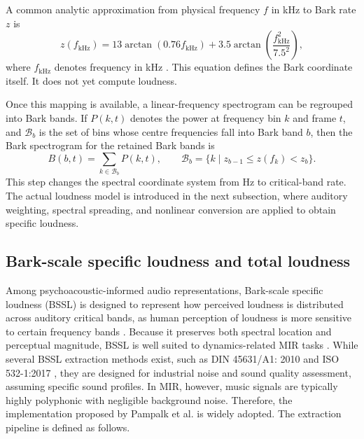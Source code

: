 A common analytic approximation from physical frequency $f$ in kHz to Bark rate $z$ is
\begin{equation}
z(f_{\mathrm{kHz}}) = 13\arctan(0.76 f_{\mathrm{kHz}}) + 3.5\arctan\!\left(\frac{f_{\mathrm{kHz}}^2}{7.5^2}\right),
\label{eq:bg:bark_mapping}
\end{equation}
where $f_{\mathrm{kHz}}$ denotes frequency in kHz \cite{pampalk2002content,pampalk2004exploring,zwicker1999psychoacoustics}. This equation defines the Bark coordinate itself. It does not yet compute loudness. 

Once this mapping is available, a linear-frequency spectrogram can be regrouped into Bark bands. If $P(k,t)$ denotes the power at frequency bin $k$ and frame $t$, and $\mathcal{B}_b$ is the set of bins whose centre frequencies fall into Bark band $b$, then the Bark spectrogram for the retained Bark bands is
\begin{equation}
B(b,t) = \sum_{k \in \mathcal{B}_b} P(k,t),
\qquad
\mathcal{B}_b = \{k \mid z_{b-1} \le z(f_k) < z_b\}.
\label{eq:bg:bark_spectrogram}
\end{equation}
This step changes the spectral coordinate system from Hz to critical-band rate. The actual loudness model is introduced in the next subsection, where auditory weighting, spectral spreading, and nonlinear conversion are applied to obtain specific loudness.


\subsection{Bark-scale specific loudness and total loudness}
Among psychoacoustic-informed audio representations, Bark-scale specific loudness (BSSL) is designed to represent how perceived loudness is distributed across auditory critical bands, as human perception of loudness is more sensitive to certain frequency bands \cite{zwicker1999psychoacoustics,zwicker2007psychoacoustics}. Because it preserves both spectral location and perceptual magnitude, BSSL is well suited to dynamics-related MIR tasks \cite{narang2024automatic,he2026dynest}. While several BSSL extraction methods exist, such as DIN 45631/A1: 2010 \cite{din45631a1_2010} and ISO 532-1:2017 \cite{iso532_1_2017}, they are designed for industrial noise and sound quality assessment, assuming specific sound profiles. In MIR, however, music signals are typically highly polyphonic with negligible background noise. Therefore, the implementation proposed by Pampalk et al. \cite{pampalk2002content, pampalk2004exploring} is widely adopted. The extraction pipeline is defined as follows.

